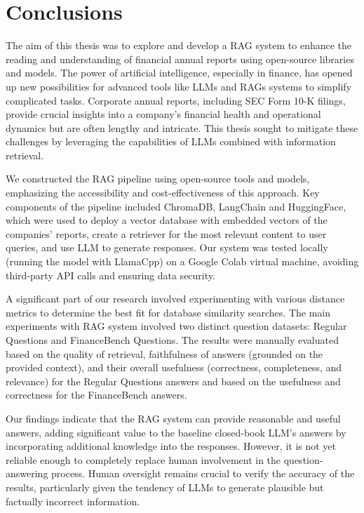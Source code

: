 \section{Conclusions}
The aim of this thesis was to explore and develop a RAG system to enhance the reading and understanding of financial annual reports using open-source libraries and models. The power of artificial intelligence, especially in finance, has opened up new possibilities for advanced tools like LLMs and RAGs systems to simplify complicated tasks. Corporate annual reports, including SEC Form 10-K filings, provide crucial insights into a company's financial health and operational dynamics but are often lengthy and intricate. This thesis sought to mitigate these challenges by leveraging the capabilities of LLMs combined with information retrieval.

We constructed the RAG pipeline using open-source tools and models, emphasizing the accessibility and cost-effectiveness of this approach. Key components of the pipeline included ChromaDB, LangChain and HuggingFace, which were used to deploy a vector database with embedded vectors of the companies' reports, create a retriever for the most relevant content to user queries, and use LLM to generate responses. Our system was tested locally (running the model with LlamaCpp) on a Google Colab virtual machine, avoiding third-party API calls and ensuring data security.

A significant part of our research involved experimenting with various distance metrics to determine the best fit for database similarity searches. The main experiments with RAG system involved two distinct question datasets: Regular Questions and FinanceBench Questions. The results were manually evaluated based on the quality of retrieval, faithfulness of answers (grounded on the provided context), and their overall usefulness (correctness, completeness, and relevance) for the Regular Questions answers and based on the usefulness and correctness for the FinanceBench answers.

Our findings indicate that the RAG system can provide reasonable and useful answers, adding significant value to the baseline closed-book LLM's answers by incorporating additional knowledge into the responses. However, it is not yet reliable enough to completely replace human involvement in the question-answering process. Human oversight remains crucial to verify the accuracy of the results, particularly given the tendency of LLMs to generate plausible but factually incorrect information.

